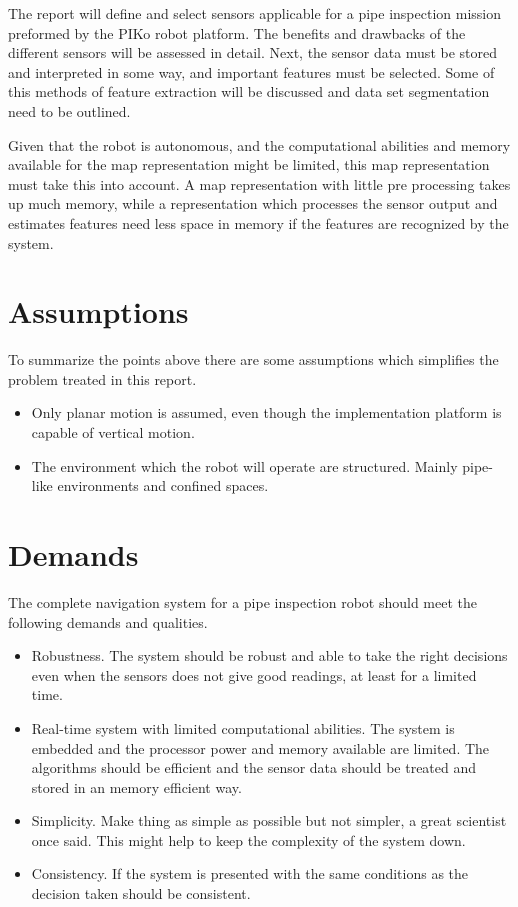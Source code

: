 The report will define and select sensors applicable for a pipe inspection mission
preformed by the PIKo robot platform. The benefits and drawbacks of the different sensors
will be assessed in detail. Next, the sensor data must be stored and interpreted in some
way, and important features must be selected. Some of this methods of feature extraction
will be discussed and data set segmentation need to be outlined. 

Given that the robot is autonomous, and the computational abilities and memory available
for the map representation might be limited, this map representation must take this into
account. A map representation with little pre processing takes up much memory, while a
representation which processes the sensor output and estimates features need less space in
memory if the features are recognized by the system. 


\section{Assumptions}
To summarize the points above there are some assumptions which simplifies the problem
treated in this report.
\begin{itemize}
    \item Only planar motion is assumed, even though the implementation platform is
    capable of vertical motion. 
    \item The environment which the robot will operate are structured. Mainly pipe-like
    environments and confined spaces. 
\end{itemize}

\section{Demands}
The complete navigation system for a pipe inspection robot should meet the following
demands and qualities. 
\begin{itemize}
    \item Robustness. The system should be robust and able to take the right decisions
    even when the sensors does not give good readings, at least for a limited time.
    \item Real-time system with limited computational abilities. The system is embedded
    and the processor power and memory available are limited. The algorithms should be
    efficient and the sensor data should be treated and stored in an memory efficient way. 
    \item Simplicity. Make thing as simple as possible but not simpler, a great scientist
    once said. This might help to keep the complexity of the system down. 
    \item Consistency. If the system is presented with the same conditions as the
    decision taken should be consistent.  
\end{itemize}


